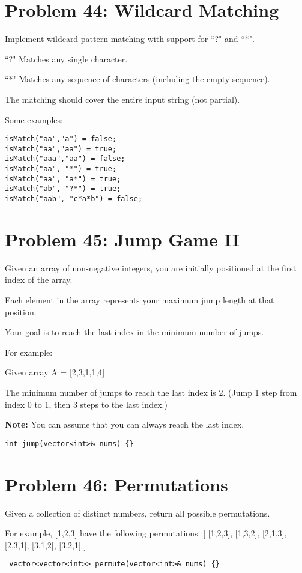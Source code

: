 \documentclass[12pt,a4paper]{article}
\begin{document}
\section*{Problem 44: Wildcard Matching}
Implement wildcard pattern matching with support for ``?" and ``*".
\par
``?" Matches any single character.
\par
``*" Matches any sequence of characters (including the empty sequence).
\par
The matching should cover the entire input string (not partial).
\par
Some examples:
\begin{lstlisting}
isMatch("aa","a") = false;
isMatch("aa","aa") = true;
isMatch("aaa","aa") = false;
isMatch("aa", "*") = true;
isMatch("aa", "a*") = true;
isMatch("ab", "?*") = true;
isMatch("aab", "c*a*b") = false;
\end{lstlisting}

\section*{Problem 45: Jump Game II}
Given an array of non-negative integers, you are initially positioned at the first index of the array.
\par
Each element in the array represents your maximum jump length at that position.
\par
Your goal is to reach the last index in the minimum number of jumps.
\par
For example:
\par
Given array A = [2,3,1,1,4]
\par
The minimum number of jumps to reach the last index is 2. (Jump 1 step from index 0 to 1, then 3 steps to the last index.)
\par
\textbf{Note:}
You can assume that you can always reach the last index.
\begin{lstlisting}
int jump(vector<int>& nums) {}
\end{lstlisting}

\section*{Problem 46: Permutations}
Given a collection of distinct numbers, return all possible permutations.
\par
For example,
[1,2,3] have the following permutations:
[
[1,2,3],
[1,3,2],
[2,1,3],
[2,3,1],
[3,1,2],
[3,2,1]
]
\begin{lstlisting}
 vector<vector<int>> permute(vector<int>& nums) {}
\end{lstlisting}
\end{document}
